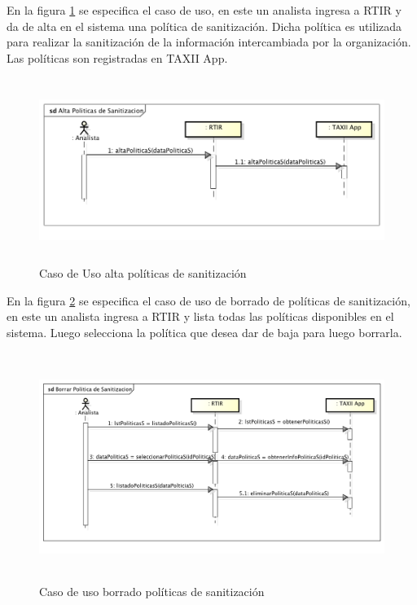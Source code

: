 {
	\bigskip
	En la figura \ref{fig.altasanitizacion} se especifica el caso de uso, en este un analista ingresa a RTIR y da de alta en el sistema una política
	de sanitización. Dicha política es utilizada para realizar la sanitización de la información intercambiada por la
	organización. Las políticas son registradas en TAXII App.}
\bigskip
\begin{figure}[H]
	\centering
	\includegraphics[width=5.7638in,height=2.3575in]{Analisis22-img/Analisis22-img017.png} 
	\caption{Caso de Uso alta políticas de sanitización}
	\label{fig.altasanitizacion}
\end{figure}

\bigskip

En la figura \ref{fig.borradosanitizacion} se especifica el caso de uso de borrado de políticas de sanitización, en este un analista ingresa a RTIR
y lista todas las políticas disponibles en el sistema. Luego selecciona la política que desea dar de baja para luego
borrarla.

\begin{figure}[H]
	\centering
	\includegraphics[width=5.7638in,height=2.9146in]{Analisis22-img/Analisis22-img018.png} 
	\caption{Caso de uso borrado políticas de sanitización}
	\label{fig.borradosanitizacion}
\end{figure}

